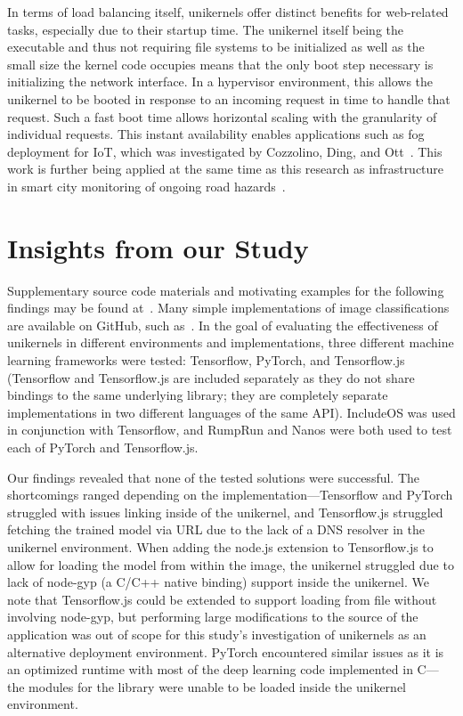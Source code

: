 \documentclass[conference]{IEEEtran}
\begin{document}
In terms of load balancing itself, unikernels offer distinct
benefits for web-related tasks, especially due to their startup
time. The unikernel itself being the executable and thus not
requiring file systems to be initialized as well as the small
size the kernel code occupies means that the only boot step
necessary is initializing the network interface. In a hypervisor
environment, this allows the unikernel to be booted in response
to an incoming request in time to handle that request. Such a
fast boot time allows horizontal scaling with the granularity of
individual requests. This instant availability enables
applications such as fog deployment for IoT, which was
investigated by Cozzolino, Ding, and Ott~\cite{fades}. This work
is further being applied at the same time as this research as
infrastructure in smart city monitoring of ongoing road
hazards~\cite{ecco}.

\section{Insights from our Study}

Supplementary source code materials and motivating examples for
the following findings may be found at~\cite{myghrepo}. Many
simple implementations of image classifications are available on
GitHub, such as~\cite{pytorchapi}. In the goal of evaluating the
effectiveness of unikernels in different environments and
implementations, three different machine learning frameworks were
tested: Tensorflow, PyTorch, and Tensorflow.js (Tensorflow and
Tensorflow.js are included separately as they do not share
bindings to the same underlying library; they are completely
separate implementations in two different languages of the same
API). IncludeOS was used in conjunction with Tensorflow, and
RumpRun and Nanos were both used to test each of PyTorch and
Tensorflow.js.

Our findings revealed that none of the tested solutions were
successful. The shortcomings ranged depending on the
implementation—Tensorflow and PyTorch struggled with issues
linking inside of the unikernel, and Tensorflow.js struggled
fetching the trained model via URL due to the lack of a DNS
resolver in the unikernel environment. When adding the node.js
extension to Tensorflow.js to allow for loading the model from
within the image, the unikernel struggled due to lack of node-gyp
(a C/C++ native binding) support inside the unikernel. We note
that Tensorflow.js could be extended to support loading from file
without involving node-gyp, but performing large modifications to
the source of the application was out of scope for this study’s
investigation of unikernels as an alternative deployment
environment. PyTorch encountered similar issues as it is an
optimized runtime with most of the deep learning code implemented
in C—the modules for the library were unable to be loaded inside
the unikernel environment.
\end{document}
